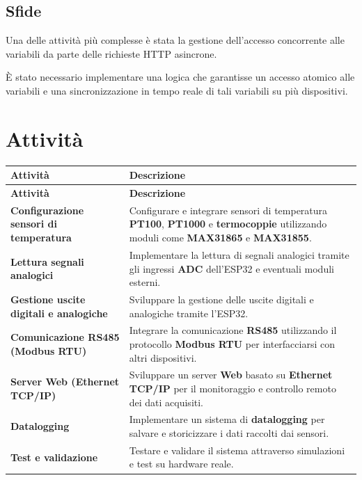 \documentclass[12pt,a4paper]{report}
\begin{document}
\section{Sfide}
Una delle attività più complesse è stata la gestione dell'accesso concorrente alle variabili da parte delle richieste HTTP asincrone.

È stato necessario implementare una logica che garantisse un accesso atomico alle variabili e una sincronizzazione in tempo reale di tali variabili su più dispositivi.



\chapter{Attività}

\begin{longtable}{|p{}|p{}|}
\hline
\textbf{Attività} & \textbf{Descrizione} \\ \hline
\endfirsthead
\hline
\textbf{Attività} & \textbf{Descrizione} \\ \hline
\endhead
\hline
\endfoot
\textbf{Configurazione sensori di temperatura} & Configurare e integrare sensori di temperatura \textbf{PT100}, \textbf{PT1000} e \textbf{termocoppie} utilizzando moduli come \textbf{MAX31865} e \textbf{MAX31855}. \\ \hline
\textbf{Lettura segnali analogici} & Implementare la lettura di segnali analogici tramite gli ingressi \textbf{ADC} dell'ESP32 e eventuali moduli esterni. \\ \hline
\textbf{Gestione uscite digitali e analogiche} & Sviluppare la gestione delle uscite digitali e analogiche tramite l'ESP32. \\ \hline
\textbf{Comunicazione RS485 (Modbus RTU)} & Integrare la comunicazione \textbf{RS485} utilizzando il protocollo \textbf{Modbus RTU} per interfacciarsi con altri dispositivi. \\ \hline
\textbf{Server Web (Ethernet TCP/IP)} & Sviluppare un server \textbf{Web} basato su \textbf{Ethernet TCP/IP} per il monitoraggio e controllo remoto dei dati acquisiti. \\ \hline
\textbf{Datalogging} & Implementare un sistema di \textbf{datalogging} per salvare e storicizzare i dati raccolti dai sensori. \\ \hline
\textbf{Test e validazione} & Testare e validare il sistema attraverso simulazioni e test su hardware reale. \\ \hline
\end{longtable}
\end{document}
